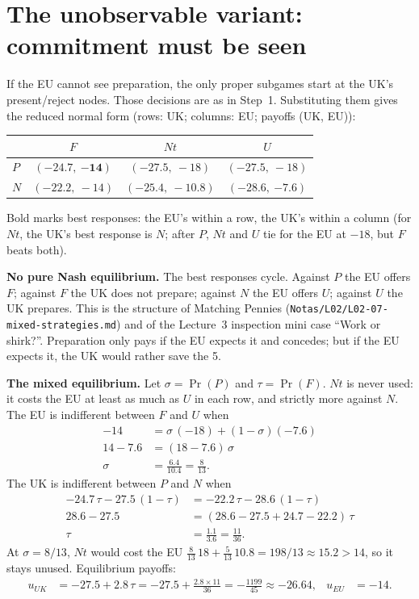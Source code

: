 \documentclass[11pt,a4paper]{article}
\newcommand{\Nt}{\mathit{Nt}}
\newcommand{\dF}{\mathit{F}}
\newcommand{\dU}{\mathit{U}}
\begin{document}
\section{The unobservable variant: commitment must be seen}

If the EU cannot see preparation, the only proper subgames start at the UK's present/reject
nodes. Those decisions are as in Step~1. Substituting them gives the reduced normal form
(rows: UK; columns: EU; payoffs (UK, EU)):

\begin{center}
\begin{tabular}{lccc}
\toprule
 & $\dF$ & $\Nt$ & $\dU$ \\
\midrule
$P$ & $(-24.7,\ \mathbf{-14})$ & $(\mathbf{-27.5},\ -18)$ & $(\mathbf{-27.5},\ -18)$ \\
$N$ & $(\mathbf{-22.2},\ -14)$ & $(\mathbf{-25.4},\ -10.8)$ & $(-28.6,\ \mathbf{-7.6})$ \\
\bottomrule
\end{tabular}
\end{center}
Bold marks best responses: the EU's within a row, the UK's within a column (for $\Nt$, the UK's best
response is $N$; after $P$, $\Nt$ and $\dU$ tie for the EU at $-18$, but $\dF$ beats both).

\textbf{No pure Nash equilibrium.} The best responses cycle. Against $P$ the EU offers $\dF$;
against $\dF$ the UK does not prepare; against $N$ the EU offers $\dU$; against $\dU$ the UK prepares.
This is the structure of Matching Pennies (\texttt{Notas/L02/L02-07-mixed-strategies.md}) and of
the Lecture~3 inspection mini case ``Work or shirk?''. Preparation only pays if the EU
expects it and concedes; but if the EU expects it, the UK would rather save the 5.

\textbf{The mixed equilibrium.} Let $\sigma=\Pr(P)$ and $\tau=\Pr(\dF)$. $\Nt$ is never used:
it costs the EU at least as much as $\dU$ in each row, and strictly more against $N$.
The EU is indifferent between $\dF$ and $\dU$ when
\begin{align*}
  -14 &= \sigma\,(-18)+(1-\sigma)(-7.6)\\
  14-7.6 &= (18-7.6)\,\sigma\\
  \sigma &= \frac{6.4}{10.4} = \frac{8}{13}.
\end{align*}
The UK is indifferent between $P$ and $N$ when
\begin{align*}
  -24.7\,\tau-27.5\,(1-\tau) &= -22.2\,\tau-28.6\,(1-\tau)\\
  28.6-27.5 &= (28.6-27.5+24.7-22.2)\,\tau\\
  \tau &= \frac{1.1}{3.6} = \frac{11}{36}.
\end{align*}
At $\sigma=8/13$, $\Nt$ would cost the EU $\tfrac{8}{13}\,18+\tfrac{5}{13}\,10.8=198/13\approx15.2>14$, so it
stays unused. Equilibrium payoffs:
\begin{align*}
  u_{UK} &= -27.5+2.8\,\tau = -27.5+\tfrac{2.8\times11}{36} = -\tfrac{1199}{45}\approx-26.64,
  & u_{EU} &= -14 .
\end{align*}
\end{document}
